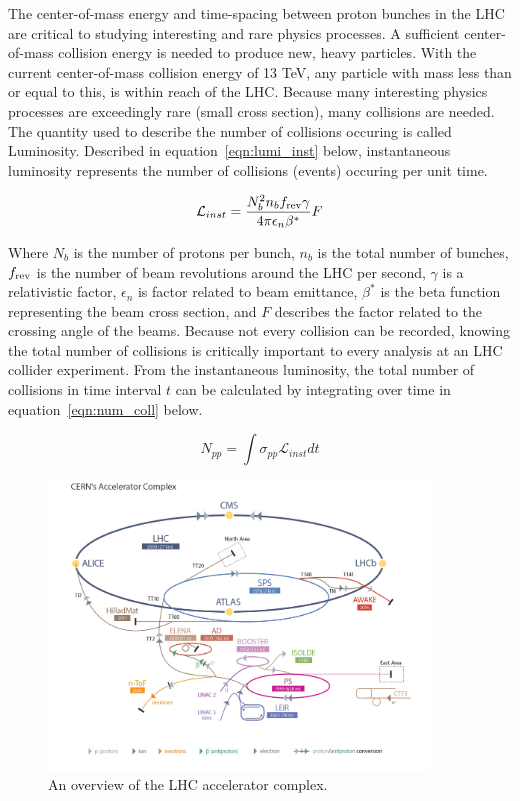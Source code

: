The center-of-mass energy and time-spacing between proton bunches in the LHC are critical to studying interesting
and rare physics processes. A sufficient center-of-mass collision energy is needed to produce new, heavy particles.
With the current center-of-mass collision energy of 13 TeV, any particle with mass less than or equal to this, is 
within reach of the LHC. Because many interesting physics processes are exceedingly rare (small cross section), many collisions
are needed. The quantity used to describe the number of collisions occuring is called Luminosity.
Described in equation~\ref{eqn:lumi_inst} below, instantaneous luminosity represents the number of collisions (events) occuring per unit time.

\begin{equation}
\label{eqn:lumi_inst}
\mathcal{L}_{inst} = \frac{N_{b}^{2}n_{b}f_{\textnormal{rev}}\gamma}{4\pi \epsilon_{n} \beta^{*}}F
\end{equation}

Where $N_{b}$ is the number of protons per bunch, $n_{b}$ is the total number of bunches, $f_{\textnormal{rev}}$ is the number of beam revolutions around the LHC per
second, $\gamma$ is a relativistic factor, $\epsilon_{n}$ is factor related to beam emittance, $\beta^{*}$ is the beta function representing the beam cross section, and
$F$ describes the factor related to the crossing angle of the beams. Because not every collision can be recorded, knowing the total number of collisions is critically important
to every analysis at an LHC collider experiment. From the instantaneous luminosity, the total number of collisions in time interval $t$ can be calculated by integrating over time
in equation~\ref{eqn:num_coll} below. 

\begin{equation}
\label{eqn:num_coll}
N_{pp} = \int \sigma_{pp}\mathcal{L}_{inst}dt 
\end{equation}


\begin{figure}[hbtp]
 \begin{center}
   \includegraphics[width=0.9\textwidth]{lhc_complex.pdf}
   \caption[text in square brackets]{An overview of the LHC accelerator complex.}
   \label{fig:lhc_complex}
 \end{center}
\end{figure}


